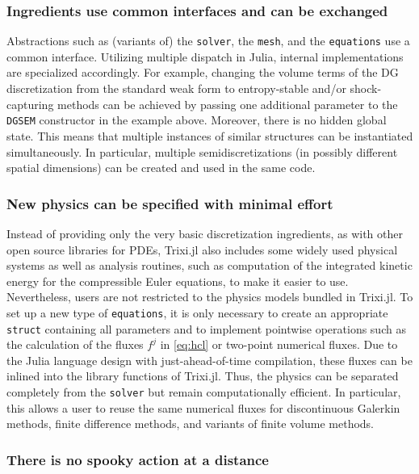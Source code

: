 \documentclass[hidelinks]{juliacon} %
\newcommand{\trixi}{Trixi.jl\xspace}
\begin{document}
\subsubsection{Ingredients use common interfaces and can be exchanged}

Abstractions such as (variants of) the \lstinline{solver}, the \lstinline{mesh},
and the \lstinline{equations} use a common interface. Utilizing multiple
dispatch in Julia, internal implementations are specialized accordingly. For
example, changing the volume terms of the DG discretization from the standard
weak form to entropy-stable and/or shock-capturing methods can be achieved by
passing one additional parameter to the \lstinline{DGSEM} constructor in the
example above. Moreover, there is no hidden global state. This means that multiple instances
of similar structures can be instantiated simultaneously. In particular, multiple
semidiscretizations (in possibly different spatial dimensions) can be created
and used in the same code.

\subsubsection{New physics can be specified with minimal effort}

Instead of providing only the very basic discretization ingredients, as with
other open source libraries for PDEs, \trixi also includes some widely used
physical systems as well as analysis routines, such as computation of the integrated kinetic energy
for the compressible Euler equations,
to make it easier to use. Nevertheless, users are not restricted
to the physics models bundled in \trixi. To set up a new type of \lstinline{equations},
it is only necessary to create an appropriate \lstinline{struct} containing all
parameters and to implement pointwise operations such as the calculation of
the fluxes $f^j$ in \eqref{eq:hcl} or two-point numerical fluxes. Due to the Julia language
design with just-ahead-of-time compilation, these fluxes can be inlined into the
library functions of \trixi. Thus, the physics can be separated completely from
the \lstinline{solver} but remain computationally efficient. In particular, this allows
a user to reuse the same numerical fluxes for discontinuous Galerkin methods, finite
difference methods, and variants of finite volume methods.

\subsubsection{There is no spooky action at a distance}
\end{document}

